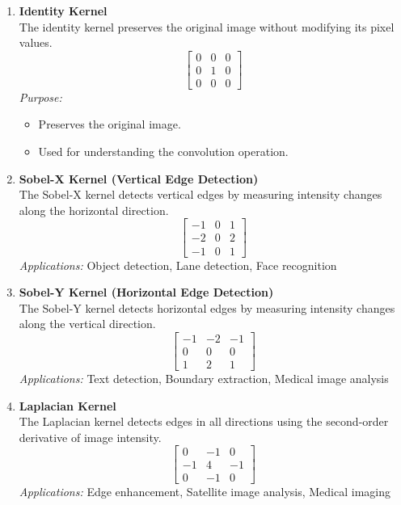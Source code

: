\documentclass[11pt]{article}
\begin{document}
\begin{enumerate}

\item \textbf{Identity Kernel} \\
The identity kernel preserves the original image without modifying its pixel values.
\[
\begin{bmatrix}
0 & 0 & 0 \\
0 & 1 & 0 \\
0 & 0 & 0
\end{bmatrix}
\]
\textit{Purpose:}
\begin{itemize}
    \item Preserves the original image.
    \item Used for understanding the convolution operation.
\end{itemize}

\item \textbf{Sobel-X Kernel (Vertical Edge Detection)} \\
The Sobel-X kernel detects vertical edges by measuring intensity changes along the horizontal direction.
\[
\begin{bmatrix}
-1 & 0 & 1 \\
-2 & 0 & 2 \\
-1 & 0 & 1
\end{bmatrix}
\]
\textit{Applications:} Object detection, Lane detection, Face recognition

\item \textbf{Sobel-Y Kernel (Horizontal Edge Detection)} \\
The Sobel-Y kernel detects horizontal edges by measuring intensity changes along the vertical direction.
\[
\begin{bmatrix}
-1 & -2 & -1 \\
0 & 0 & 0 \\
1 & 2 & 1
\end{bmatrix}
\]
\textit{Applications:} Text detection, Boundary extraction, Medical image analysis

\item \textbf{Laplacian Kernel} \\
The Laplacian kernel detects edges in all directions using the second-order derivative of image intensity.
\[
\begin{bmatrix}
0 & -1 & 0 \\
-1 & 4 & -1 \\
0 & -1 & 0
\end{bmatrix}
\]
\textit{Applications:} Edge enhancement, Satellite image analysis, Medical imaging


\end{enumerate}
\end{document}
